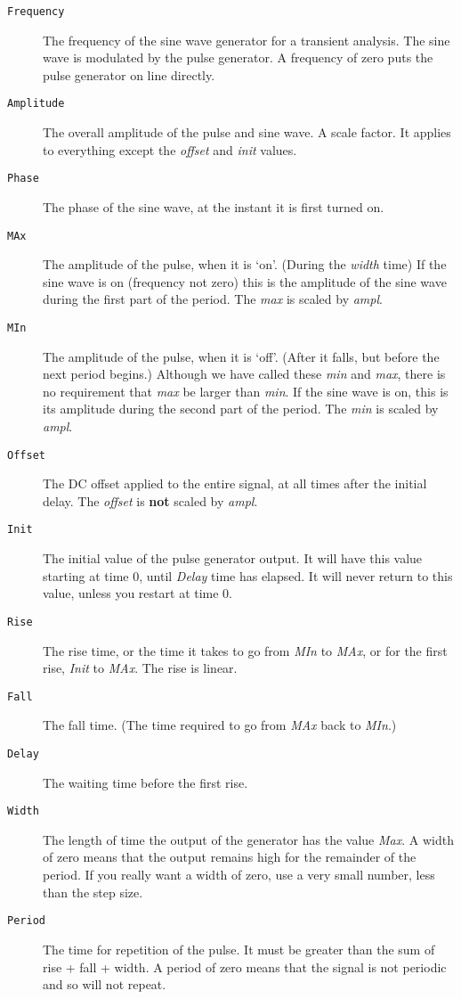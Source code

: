 \begin{description}

\item[{\tt Frequency}] The frequency of the sine wave generator for a transient
analysis.  The sine wave is modulated by the pulse generator.  A frequency
of zero puts the pulse generator on line directly.

\item[{\tt Amplitude}] The overall amplitude of the pulse and sine wave.  A
scale factor.  It applies to everything except the {\it offset} and {\it
init} values.

\item[{\tt Phase}] The phase of the sine wave, at the instant it is first
turned on.

\item[{\tt MAx}] The amplitude of the pulse, when it is `on'.  (During the
{\it width} time) If the sine wave is on (frequency not zero) this is the
amplitude of the sine wave during the first part of the period.  The {\it
max} is scaled by {\it ampl}.

\item[{\tt MIn}] The amplitude of the pulse, when it is `off'.  (After it
falls, but before the next period begins.)  Although we have called these
{\it min} and {\it max}, there is no requirement that {\it max} be larger
than {\it min}.  If the sine wave is on, this is its amplitude during the
second part of the period.  The {\it min} is scaled by {\it ampl}.

\item[{\tt Offset}] The DC offset applied to the entire signal, at all times
after the initial delay.  The {\it offset} is {\bf not} scaled by {\it ampl}.

\item[{\tt Init}] The initial value of the pulse generator output.  It will
have this value starting at time 0, until {\it Delay} time has elapsed.  It
will never return to this value, unless you restart at time 0.

\item[{\tt Rise}] The rise time, or the time it takes to go from {\it MIn}
to {\it MAx}, or for the first rise, {\it Init} to {\it MAx}.  The rise is
linear.

\item[{\tt Fall}] The fall time.  (The time required to go from {\it MAx}
back to {\it MIn}.)

\item[{\tt Delay}] The waiting time before the first rise.

\item[{\tt Width}] The length of time the output of the generator has the
value {\it Max}.  A width of zero means that the output remains high for the
remainder of the period.  If you really want a width of zero, use a very
small number, less than the step size.

\item[{\tt Period}] The time for repetition of the pulse.  It must be
greater than the sum of rise + fall + width.  A period of zero means that
the signal is not periodic and so will not repeat.

\end{description}
